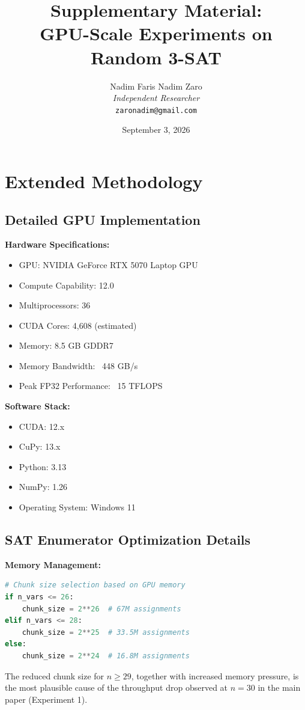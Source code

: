 \documentclass[11pt]{article}
\title{\textbf{Supplementary Material:} \\ GPU-Scale Experiments on Random 3-SAT}
\author{
  Nadim Faris Nadim Zaro \\
  \textit{Independent Researcher} \\
  \texttt{zaronadim@gmail.com}
}
\date{September 3, 2026}
\begin{document}
\maketitle

\tableofcontents

\section{Extended Methodology}

\subsection{Detailed GPU Implementation}

\textbf{Hardware Specifications:}
\begin{itemize}
\item GPU: NVIDIA GeForce RTX 5070 Laptop GPU
\item Compute Capability: 12.0
\item Multiprocessors: 36
\item CUDA Cores: 4,608 (estimated)
\item Memory: 8.5 GB GDDR7
\item Memory Bandwidth: ~448 GB/s
\item Peak FP32 Performance: ~15 TFLOPS
\end{itemize}

\textbf{Software Stack:}
\begin{itemize}
\item CUDA: 12.x
\item CuPy: 13.x
\item Python: 3.13
\item NumPy: 1.26
\item Operating System: Windows 11
\end{itemize}

\subsection{SAT Enumerator Optimization Details}

\textbf{Memory Management:}
\begin{lstlisting}[language=Python]
# Chunk size selection based on GPU memory
if n_vars <= 26:
    chunk_size = 2**26  # 67M assignments
elif n_vars <= 28:
    chunk_size = 2**25  # 33.5M assignments
else:
    chunk_size = 2**24  # 16.8M assignments
\end{lstlisting}

The reduced chunk size for $n \geq 29$, together with increased memory
pressure, is the most plausible cause of the throughput drop observed at
$n=30$ in the main paper (Experiment 1).
\end{document}
